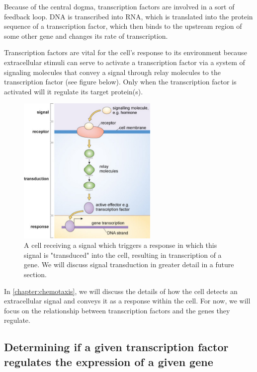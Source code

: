 Because of the central dogma, transcription factors are involved in a sort of feedback loop. DNA is transcribed into RNA, which is translated into the protein sequence of a transcription factor, which then binds to the upstream region of some other gene and changes its rate of transcription.

Transcription factors are vital for the cell's response to its environment because extracellular stimuli can serve to activate a transcription factor via a system of signaling molecules that convey a signal through relay molecules to the transcription factor (see figure below). Only when the transcription factor is activated will it regulate its target protein(s).

\begin{figure}[h]
\centering
\mySfFamily
\includegraphics[width = 0.6\textwidth]{../assets/images/600px/signal_pathway.jpg}
\caption{A cell receiving a signal which triggers a response in which this signal is "transduced" into the cell, resulting in transcription of a gene. We will discuss signal transduction in greater detail in a future section.}
\label{fig:genetic_code}
\end{figure}

In \autoref{chapter:chemotaxis}, we will discuss the details of how the cell detects an extracellular signal and conveys it as a response within the cell. For now, we will focus on the relationship between transcription factors and the genes they regulate.

\FloatBarrier
{}
\subsection{Determining if a given transcription factor regulates the expression of a given gene}

